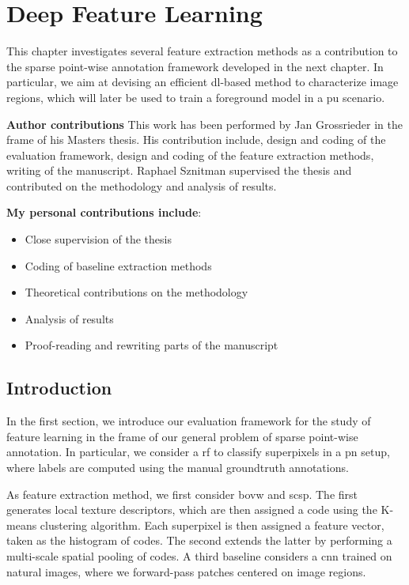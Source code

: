 \chapter{Deep Feature Learning}
This chapter investigates several feature extraction methods as a contribution to the sparse point-wise annotation framework developed in the next chapter.
In particular, we aim at devising an efficient \gls{dl}-based method to characterize image regions, which will later be used to train a foreground model in a \gls{pu} scenario.

\textbf{Author contributions} This work has been performed by Jan Grossrieder in the frame of his Masters thesis.
His contribution include, design and coding of the evaluation framework, design and coding of the feature extraction methods, writing of the manuscript.
Raphael Sznitman supervised the thesis and contributed on the methodology and analysis of results.

\textbf{My personal contributions include}:
\begin{itemize}
    \item Close supervision of the thesis
    \item Coding of baseline extraction methods
    \item Theoretical contributions on the methodology
    \item Analysis of results
    \item Proof-reading and rewriting parts of the manuscript
\end{itemize}

\section{Introduction}

In the first section, we introduce our evaluation framework for the study of feature learning in the frame of our general problem of sparse point-wise annotation.
In particular, we consider a \gls{rf} to classify superpixels in a \gls{pn} setup,
where labels are computed using the manual groundtruth annotations.

As feature extraction method, we first consider \gls{bovw} and \gls{scsp}.
The first generates local texture descriptors, which are then assigned a code using the K-means clustering algorithm.
Each superpixel is then assigned a feature vector, taken as the histogram of codes.
The second extends the latter by performing a multi-scale spatial pooling of codes.
A third baseline considers a \gls{cnn} trained on natural images, where we forward-pass patches centered on image regions.

